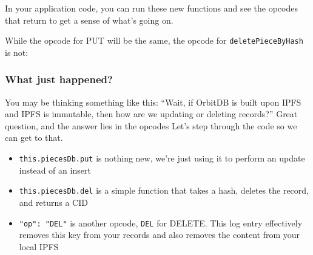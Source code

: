 In your application code, you can run these new functions and see the
opcodes that return to get a sense of what's going on.

\begin{Shaded}
\begin{Highlighting}[]
\OperatorTok{=}\NormalTok{(}\OperatorTok{,} \NormalTok{)}

\OperatorTok{=}\NormalTok{(}\NormalTok{)}
\OperatorTok{=}
\NormalTok{(}\NormalTok{)}
\end{Highlighting}
\end{Shaded}

While the opcode for PUT will be the same, the opcode for
\texttt{deletePieceByHash} is not:

\begin{Shaded}
\begin{Highlighting}[]
\FunctionTok{\{}
  \FunctionTok{:}\FunctionTok{,}
  \FunctionTok{:}\FunctionTok{,}
  \FunctionTok{:}
\FunctionTok{\}}
\end{Highlighting}
\end{Shaded}

\subsubsection{What just happened?}\label{what-just-happened-8}

You may be thinking something like this: ``Wait, if OrbitDB is built
upon IPFS and IPFS is immutable, then how are we updating or deleting
records?'' Great question, and the answer lies in the opcodes Let's step
through the code so we can get to that.

\begin{itemize}
\tightlist
\item
  \texttt{this.piecesDb.put} is nothing new, we're just using it to
  perform an update instead of an insert
\item
  \texttt{this.piecesDb.del} is a simple function that takes a hash,
  deletes the record, and returns a CID
\item
  \texttt{"op":\ "DEL"} is another opcode, \texttt{DEL} for DELETE. This
  log entry effectively removes this key from your records and also
  removes the content from your local IPFS
\end{itemize}


